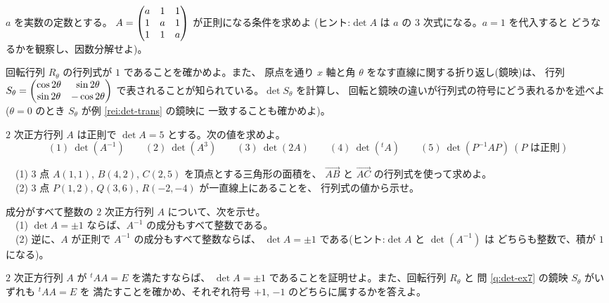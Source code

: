\begin{mondai}[標準]\label{q:det-ex6}
$a$ を実数の定数とする。
$A = \begin{pmatrix}a & 1 & 1 \\ 1 & a & 1 \\ 1 & 1 & a\end{pmatrix}$ が正則になる条件を求めよ
(ヒント:$\det A$ は $a$ の $3$ 次式になる。$a = 1$ を代入すると
どうなるかを観察し、因数分解せよ)。
\end{mondai}

\begin{mondai}[標準]\label{q:det-ex7}
回転行列 $R_\theta$ の行列式が $1$ であることを確かめよ。また、
原点を通り $x$ 軸と角 $\theta$ をなす直線に関する折り返し(鏡映)は、
行列 $S_\theta = \begin{pmatrix}\cos 2\theta & \sin 2\theta \\ \sin 2\theta & -\cos 2\theta\end{pmatrix}$
で表されることが知られている。$\det S_\theta$ を計算し、
回転と鏡映の違いが行列式の符号にどう表れるかを述べよ
($\theta = 0$ のとき $S_\theta$ が例 \ref{rei:det-trans} の鏡映に
一致することも確かめよ)。
\end{mondai}

\begin{mondai}[標準]\label{q:det-ex8}
$2$ 次正方行列 $A$ は正則で $\det A = 5$ とする。次の値を求めよ。
\[
(1)\ \det(A^{-1}) \qquad (2)\ \det(A^3) \qquad (3)\ \det(2A) \qquad
(4)\ \det({}^t\!A) \qquad (5)\ \det(P^{-1}AP)\ (P \text{ は正則})
\]
\end{mondai}

\begin{mondai}[発展]\label{q:det-ex9}
　(1) $3$ 点 $A(1, 1)$, $B(4, 2)$, $C(2, 5)$ を頂点とする三角形の面積を、
$\overrightarrow{AB}$ と $\overrightarrow{AC}$ の行列式を使って求めよ。\\
　(2) $3$ 点 $P(1, 2)$, $Q(3, 6)$, $R(-2, -4)$ が一直線上にあることを、
行列式の値から示せ。
\end{mondai}

\begin{mondai}[発展]\label{q:det-ex10}
成分がすべて整数の $2$ 次正方行列 $A$ について、次を示せ。\\
　(1) $\det A = \pm 1$ ならば、$A^{-1}$ の成分もすべて整数である。\\
　(2) 逆に、$A$ が正則で $A^{-1}$ の成分もすべて整数ならば、
$\det A = \pm 1$ である(ヒント:$\det A$ と $\det(A^{-1})$ は
どちらも整数で、積が $1$ になる)。
\end{mondai}

\begin{mondai}[証明]\label{q:det-ex11}
$2$ 次正方行列 $A$ が ${}^t\!A A = E$ を満たすならば、
$\det A = \pm 1$ であることを証明せよ。また、回転行列 $R_\theta$ と
問 \ref{q:det-ex7} の鏡映 $S_\theta$ がいずれも ${}^t\!A A = E$ を
満たすことを確かめ、それぞれ符号 $+1$, $-1$ のどちらに属するかを答えよ。
\end{mondai}

